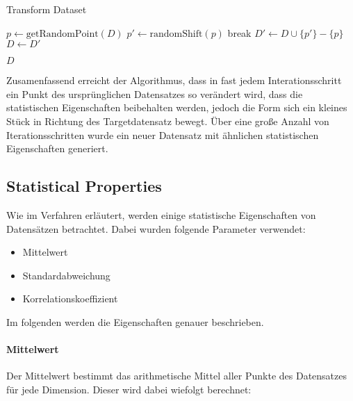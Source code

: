 \documentclass[sigconf]{acmart}
\begin{document}
\begin{algorithm}
  \caption{Transform Dataset}\label{alg:transform}
  \begin{algorithmic}

    \State $p \gets \text{getRandomPoint}(D) $
      \State $p' \gets \text{randomShift}(p)$
        \State break
      \EndIf
    \EndWhile
    \State $D' \gets D \cup \{p' \} - \{p \}$ 
      \State $D \gets D'$
    \EndIf

  \EndFor
  \State \Return $D$

  \EndFunction
  \end{algorithmic}
\end{algorithm}

Zusamenfassend erreicht der Algorithmus, dass in fast jedem Interationsschritt ein Punkt des ursprünglichen Datensatzes so verändert wird, dass die statistischen Eigenschaften beibehalten werden, jedoch die Form sich ein kleines Stück in Richtung des Targetdatensatz bewegt. Über eine große Anzahl von Iterationsschritten wurde ein neuer Datensatz mit ähnlichen statistischen Eigenschaften generiert.
  
\subsection{Statistical Properties}\label{sec:algo:stats}

Wie im Verfahren erläutert, werden einige statistische Eigenschaften von Datensätzen betrachtet. Dabei wurden folgende Parameter verwendet:

\begin{itemize}
  \item Mittelwert
  \item Standardabweichung
  \item Korrelationskoeffizient
\end{itemize}

Im folgenden werden die Eigenschaften genauer beschrieben.

\paragraph{Mittelwert}

Der Mittelwert bestimmt das arithmetische Mittel aller Punkte des Datensatzes für jede Dimension. Dieser wird dabei wiefolgt berechnet:
\end{document}
